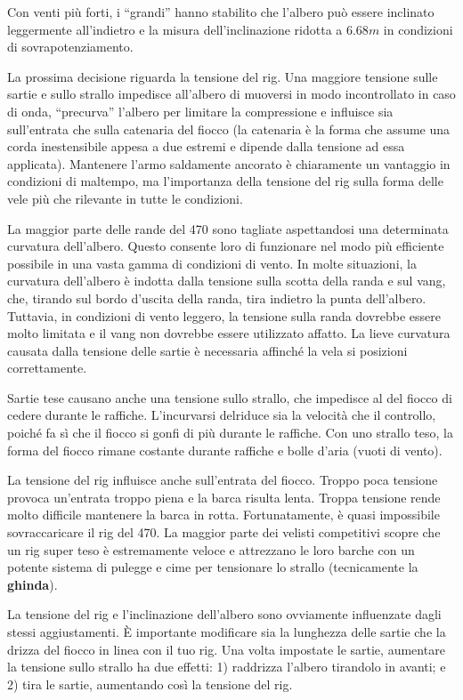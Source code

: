 Con venti più forti, i ``grandi'' hanno stabilito che l'albero può essere
inclinato leggermente all'indietro e la misura dell'inclinazione ridotta a
$6.68\si{m}$ in condizioni di sovrapotenziamento.

La prossima decisione riguarda la tensione del rig. Una maggiore tensione sulle
sartie e sullo strallo impedisce all'albero di muoversi in modo incontrollato in
caso di onda, ``precurva'' l'albero per limitare la compressione e influisce sia
sull'entrata che sulla catenaria del fiocco (la catenaria è la forma che assume
una corda inestensibile appesa a due estremi e dipende dalla tensione ad essa
applicata). Mantenere l'armo saldamente ancorato è chiaramente un vantaggio
in condizioni di maltempo, ma l'importanza della tensione del rig sulla
forma delle vele più che rilevante in tutte le condizioni.

La maggior parte delle rande del 470 sono tagliate aspettandosi una determinata
curvatura dell'albero. Questo consente loro di funzionare nel modo più
efficiente possibile in una vasta gamma di condizioni di vento. In molte
situazioni, la curvatura dell'albero è indotta dalla tensione sulla scotta della
randa e sul vang, che, tirando sul bordo d'uscita della randa, tira indietro la
punta dell'albero. Tuttavia, in condizioni di vento leggero, la tensione sulla
randa dovrebbe essere molto limitata e il vang non dovrebbe essere utilizzato
affatto. La lieve curvatura causata dalla tensione delle sartie è necessaria
affinché la vela si posizioni correttamente.

Sartie tese causano anche una tensione sullo strallo, che impedisce al\theluff
del fiocco di cedere durante le raffiche. L'incurvarsi del\theluff riduce sia la
velocità che il controllo, poiché fa sì che il fiocco si gonfi di più durante le
raffiche. Con uno strallo teso, la forma del fiocco rimane costante durante
raffiche e bolle d'aria (vuoti di vento).

La tensione del rig influisce anche sull'entrata del fiocco. Troppo poca
tensione provoca un'entrata troppo piena e la barca risulta lenta. Troppa
tensione rende molto difficile mantenere la barca in rotta.
Fortunatamente, è quasi impossibile sovraccaricare il rig del 470. La maggior
parte dei velisti competitivi scopre che un rig super teso è estremamente
veloce e attrezzano le loro barche con un potente sistema di pulegge e cime per
tensionare lo strallo (tecnicamente la \textbf{ghinda}).

La tensione del rig e l'inclinazione dell'albero sono ovviamente influenzate
dagli stessi aggiustamenti. È importante modificare sia la lunghezza delle
sartie che la drizza del fiocco in linea con il tuo rig. Una volta impostate le
sartie, aumentare la tensione sullo strallo ha due effetti: 1) raddrizza
l'albero tirandolo in avanti; e 2) tira le sartie, aumentando
così la tensione del rig.

